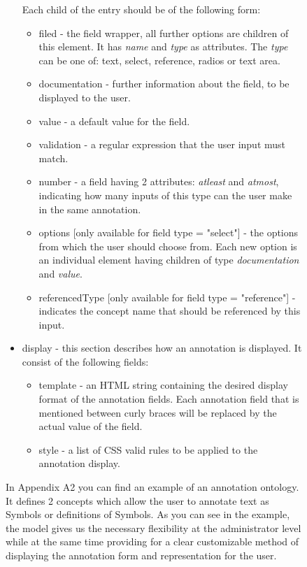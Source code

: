\documentclass[a4paper, 12pt, notitlepage]{report}
\begin{document}
\begin{figure}[ht]
\begin{itemize}
  Each child of the entry should be of the following form:
  \begin{itemize}
  \item filed - the field wrapper, all further options are children of this element. It
    has \textit{name} and \textit{type} as attributes. The \textit{type} can be one of:
    text, select, reference, radios or text area.
  \item documentation - further information about the field, to be displayed to the user.
  \item value - a default value for the field.
  \item validation - a regular expression that the user input must match.
  \item number - a field having 2 attributes: \textit{atleast} and \textit{atmost},
    indicating how many inputs of this type can the user make in the same annotation.
  \item options [only available for field type = "select"] - the options from which the
    user should choose from. Each new option is an individual element having children of
    type \textit{documentation} and \textit{value}.
  \item referencedType [only available for field type = "reference"] - indicates the
    concept name that should be referenced by this input.
  \end{itemize}
\item display - this section describes how an annotation is displayed. It consist of the
  following fields:
  \begin{itemize}
  \item template - an HTML string containing the desired display format of the annotation
    fields. Each annotation field that is mentioned between curly braces will be replaced
    by the actual value of the field.
  \item style - a list of CSS valid rules to be applied to the annotation display.
  \end{itemize}
\end{itemize}

In Appendix A2 you can find an example of an annotation ontology. It defines 2 concepts
which allow the user to annotate text as Symbols or definitions of Symbols. As you can see
in the example, the model gives us the necessary flexibility at the administrator level
while at the same time providing for a clear customizable method of displaying the
annotation form and representation for the user.


\end{figure}
\end{document}
